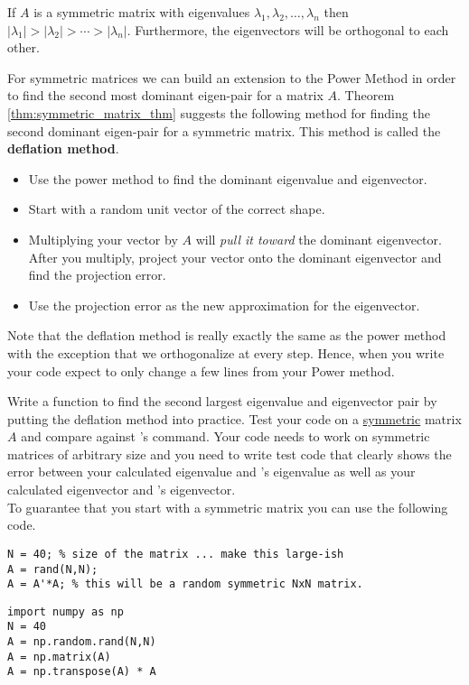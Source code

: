 \begin{thm}\label{thm:symmetric_matrix_thm}
    If $A$ is a symmetric matrix with eigenvalues $\lambda_1, \lambda_2, \ldots,
    \lambda_n$ then $|\lambda_1| > |\lambda_2| > \cdots > |\lambda_n|$.  Furthermore, the
    eigenvectors will be orthogonal to each other. 
\end{thm}


\begin{problem}
    For symmetric matrices we can build an extension to the Power Method in order
    to find the second most dominant eigen-pair for a matrix $A$.  Theorem
    \ref{thm:symmetric_matrix_thm} suggests the following method for finding the second
    dominant eigen-pair for a symmetric matrix.  This method is called the {\bf deflation
    method}.
    \begin{itemize}
        \item Use the power method to find the dominant eigenvalue and eigenvector.
        \item Start with a random unit vector of the correct shape.
        \item Multiplying your vector by $A$ will {\it pull it toward} the dominant
            eigenvector.  After you multiply, project your vector onto the dominant
            eigenvector and find the projection error.  
        \item Use the projection error as the new approximation for the eigenvector.
    \end{itemize}    

    Note that the deflation method is really exactly the same as the power method with the
    exception that we orthogonalize at every step.  Hence, when you write your code expect
    to only change a few lines from your Power method.

    Write a \ProgLang function  to find the second largest eigenvalue and
    eigenvector pair by putting the deflation method into practice. Test your code on a
    \underline{symmetric} matrix $A$ and compare against \ProgLang's  command.
    Your code needs to work on symmetric matrices of arbitrary size and you need to write
    test code that clearly shows the error between your calculated eigenvalue and
    \ProgLang's
    eigenvalue as well as your calculated eigenvector and \ProgLang's eigenvector.\\ To
    guarantee that you start with a symmetric matrix you can use the following code.
    \ifnum{}
\begin{lstlisting}
N = 40; % size of the matrix ... make this large-ish
A = rand(N,N);
A = A'*A; % this will be a random symmetric NxN matrix.
\end{lstlisting}
\else
\begin{lstlisting}
import numpy as np
N = 40
A = np.random.rand(N,N)
A = np.matrix(A)
A = np.transpose(A) * A
\end{lstlisting}
\fi
\end{problem}
